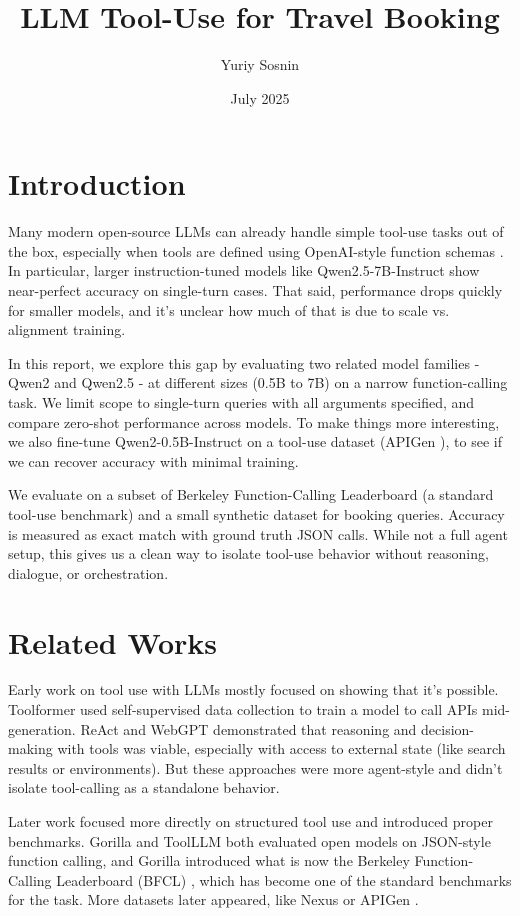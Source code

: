 \documentclass[12pt]{extarticle}
\title{LLM Tool-Use for Travel Booking}
\author{Yuriy Sosnin}
\date{July 2025}
\begin{document}
\maketitle

\section{Introduction}

Many modern open-source LLMs can already handle simple tool-use tasks out of the box, especially when tools are defined using OpenAI-style function schemas \cite{openai}. In particular, larger instruction-tuned models like Qwen2.5-7B-Instruct \cite{qwen25} show near-perfect accuracy on single-turn cases. That said, performance drops quickly for smaller models, and it's unclear how much of that is due to scale vs. alignment training.

In this report, we explore this gap by evaluating two related model families - Qwen2 \cite{qwen2} and Qwen2.5 \cite{qwen25} - at different sizes (0.5B to 7B) on a narrow function-calling task. We limit scope to single-turn queries with all arguments specified, and compare zero-shot performance across models. To make things more interesting, we also fine-tune Qwen2-0.5B-Instruct on a tool-use dataset (APIGen \cite{apigen}), to see if we can recover accuracy with minimal training.

We evaluate on a subset of Berkeley Function-Calling Leaderboard \cite{bfcl} (a standard tool-use benchmark) and a small synthetic dataset for booking queries. Accuracy is measured as exact match with ground truth JSON calls. While not a full agent setup, this gives us a clean way to isolate tool-use behavior without reasoning, dialogue, or orchestration.

\section{Related Works}

Early work on tool use with LLMs mostly focused on showing that it’s possible. Toolformer \cite{toolformer} used self-supervised data collection to train a model to call APIs mid-generation. ReAct \cite{react} and WebGPT \cite{webgpt} demonstrated that reasoning and decision-making with tools was viable, especially with access to external state (like search results or environments). But these approaches were more agent-style and didn’t isolate tool-calling as a standalone behavior.

Later work focused more directly on structured tool use and introduced proper benchmarks. Gorilla \cite{gorilla} and ToolLLM \cite{toolllm} both evaluated open models on JSON-style function calling, and Gorilla introduced what is now the Berkeley Function-Calling Leaderboard (BFCL) \cite{bfcl}, which has become one of the standard benchmarks for the task. More datasets later appeared, like Nexus \cite{nexus} or APIGen \cite{apigen}.
\end{document}

